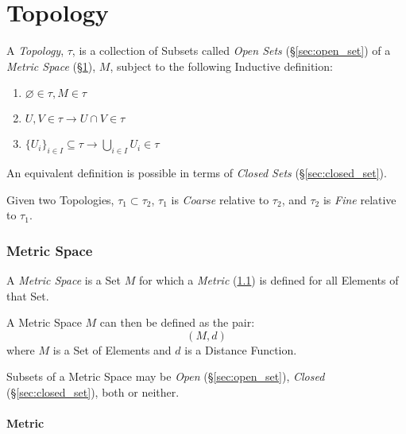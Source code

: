 \part{Topology}\label{sec:topology}\cite{lc11}

A \emph{Topology}, $\tau$, is a collection of Subsets called
\emph{Open Sets} (\S\ref{sec:open_set}) of a \emph{Metric Space}
(\S\ref{sec:metric_space}), $M$, subject to the following Inductive
definition:
\begin{enumerate}
\item $\varnothing \in \tau, M \in \tau$
\item $U,V \in \tau \rightarrow U \cap V \in \tau$
\item $\{U_i\}_{i \in I} \subseteq \tau \rightarrow \bigcup_{i \in I}
  U_i \in \tau$
\end{enumerate}

An equivalent definition is possible in terms of \emph{Closed Sets}
(\S\ref{sec:closed_set}).

Given two Topologies, $\tau_1 \subset \tau_2$, $\tau_1$ is
\emph{Coarse} relative to $\tau_2$, and $\tau_2$ is \emph{Fine}
relative to $\tau_1$.



\section{Metric Space}\label{sec:metric_space}

A \emph{Metric Space} is a Set $M$ for which a \emph{Metric}
(\ref{sec:metric}) is defined for all Elements of that Set.

A Metric Space $M$ can then be defined as the pair:
\[
    (M,d)
\]
where $M$ is a Set of Elements and $d$ is a Distance Function.

Subsets of a Metric Space may be \emph{Open}
(\S\ref{sec:open_set}), \emph{Closed} (\S\ref{sec:closed_set}),
both or neither.



\subsection{Metric}\label{sec:metric}

